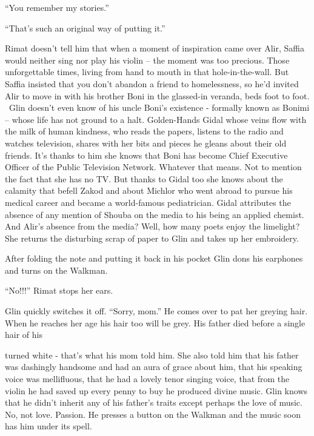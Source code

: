 \documentclass[twoside,11pt]{book}
\begin{document}
``You remember my stories.'' 

``That's such an original way of putting it.''

Rimat doesn't tell him that when a moment of inspiration came over
Alir, Saffia would neither sing nor play his violin -- the moment was too precious. Those unforgettable times, living
from hand to mouth in that hole-in-the-wall. But Saffia insisted that you don't abandon a friend to
homelessness, so he'd invited Alir to move in with his brother Boni in the
glassed-in veranda, beds foot to foot. \ Glin doesn't even know of his uncle Boni's existence - formally known as
Bonimi -- whose life has not ground to a halt. Golden-Hands Gidal whose veins flow with the milk of human kindness, who
reads the papers, listens to the radio and watches television, shares with her bits and pieces he gleans about their
old friends. It's thanks to him she knows that Boni has become Chief Executive Officer of the Public Television
Network. Whatever that means. Not to mention the fact that she has no TV. But thanks to Gidal too she knows about the
calamity that befell Zakod and about Michlor who went abroad to pursue his medical career and became a world-famous
pediatrician. Gidal attributes the absence of any mention of Shouba on the media to his being an applied chemist. And
Alir's absence from the media? Well, how many poets enjoy the limelight? She returns the disturbing
scrap of paper to Glin and takes up her embroidery.

After folding the note
and putting it back in his pocket Glin dons his earphones and turns
on the Walkman. 

``No!!!'' Rimat stops her ears. 

Glin quickly switches it off. ``Sorry, mom.'' He comes over to pat her
greying hair.  When he reaches her age his hair too will be grey.  His
father died before a single hair of his

turned white - that's what his mom told him. She also told him that
his father was dashingly handsome and had an aura of grace about him,
that his speaking voice was mellifluous, that he had a lovely tenor
singing voice, that from the violin he had saved up every penny to buy
he produced divine music. Glin knows that he didn't inherit any of his
father's traits except perhaps the love of music. No, not
love. Passion. He presses a button on the Walkman and the music soon
has him under its spell.


\chapter{}
\end{document}
